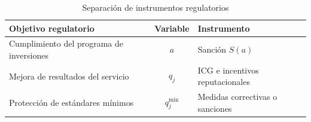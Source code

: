 \begin{table}[H]
\centering
\caption{Separación de instrumentos regulatorios}
\normalsize
\setlength{\tabcolsep}{3pt}
\renewcommand{\arraystretch}{1.15}
\begin{tabularx}{\columnwidth}{
>{\raggedright\arraybackslash}p{}
c
>{\raggedright\arraybackslash}X
}
\hline
\textbf{Objetivo regulatorio} & \textbf{Variable} & \textbf{Instrumento} \\
\hline
Cumplimiento del programa de inversiones
& \(a\)
& Sanción \(S(a)\) \\

Mejora de resultados del servicio
& \(q_j\)
& ICG e incentivos reputacionales \\

Protección de estándares mínimos
& \(q_j^{\min}\)
& Medidas correctivas o sanciones \\
\hline
\end{tabularx}
\end{table}